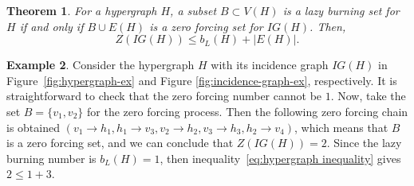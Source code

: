 \documentclass[12pt]{article}
\theoremstyle{plain}
\newtheorem{theorem}{Theorem}[section]
\theoremstyle{definition}
\newtheorem{example}[theorem]{Example}
\theoremstyle{remark}
\begin{document}








\begin{theorem}{\cite[Theorem 25]{hypergraph}}
   For a hypergraph $H$, a subset $B\subset V(H)$ is a lazy burning set for $H$ if and only if $B\cup E(H)$ is a zero forcing set for $IG(H)$. Then,
   \begin{equation}\label{eq:hypergraph inequality}
           Z(IG(H)) \leq b_L(H) + |E(H)|.
   \end{equation}
   \label{thm:hypergraph bound}
\end{theorem}
\vspace{-0.9cm}

\begin{example}
    Consider the hypergraph $H$ with its incidence graph $IG(H)$ in Figure~\ref{fig:hypergraph-ex} and Figure \ref{fig:incidence-graph-ex}, respectively. It is straightforward to check that the zero forcing number cannot be $1$. 
    Now, take the set $B=\{v_1,v_2\}$ for the zero forcing process. Then the following zero forcing chain is obtained $(v_1\rightarrow h_1,h_1\rightarrow v_3,v_2\rightarrow h_2,v_3\rightarrow h_3,h_2\rightarrow v_4)$, which means that $B$ is a zero forcing set, and we can conclude that $Z(IG(H))=2$. 
    Since the lazy burning number is $b_L(H)=1$, then inequality~\eqref{eq:hypergraph inequality} gives $2\leq 1+3$.
\end{example}
\end{document}

